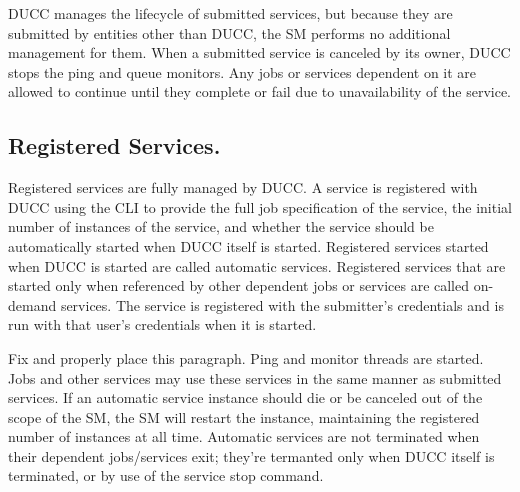      DUCC manages the lifecycle of submitted services, but because they are submitted by entities
      other than DUCC, the SM performs no additional management for them. When a submitted service is
      canceled by its owner, DUCC stops the ping and queue monitors. Any jobs or services dependent on
      it are allowed to continue until they complete or fail due to unavailability of the service.
      
      \subsection{Registered Services.} Registered services are fully managed by DUCC. A service is
      registered with DUCC using the CLI to provide the full job specification of the service, the
      initial number of instances of the service, and whether the service should be automatically
      started when DUCC itself is started. Registered services started when DUCC is started are
      called automatic services.  Registered services that are started only when referenced by other
      dependent jobs or services are called on-demand services. The service is registered with the
      submitter's credentials and is run with that user's credentials when it is started.

      \todo Fix and properly place this paragraph.
          Ping and monitor threads are started. Jobs and other services may use these services in the same
          manner as submitted services. If an automatic service instance should die or be canceled out of
          the scope of the SM, the SM will restart the instance, maintaining the registered number of
          instances at all time. Automatic services are not terminated when their dependent jobs/services
          exit; they're termanted only when DUCC itself is terminated, or by use of the service stop
          command.

